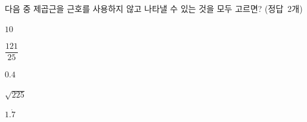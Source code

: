 다음 중 제곱근을 근호를 사용하지 않고 나타낼 수 있는 것을 모두 고르면? \mbox{(정답 2개)}
\begin{choices32}{\rule[-3ex]{0pt}{8ex}$10$}{\rule[-3ex]{0pt}{8ex}$\dfrac{121}{25}$}{\rule[-3ex]{0pt}{8ex}$0.4$}{\rule[-3ex]{0pt}{8ex}$\sqrt{225}$}{\rule[-3ex]{0pt}{8ex}$1.\dot{7}$}\end{choices32}
